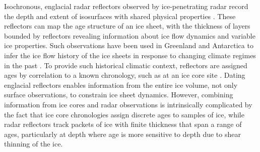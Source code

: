 

Isochronous, englacial radar reflectors observed by ice-penetrating radar record the depth and extent of isosurfaces with shared physical properties \citep{siegert1998,dowdeswell2004}. These reflectors can map the age structure of an ice sheet, with the thickness of layers bounded by reflectors revealing information about ice flow dynamics and variable ice properties. Such observations have been used in Greenland and Antarctica to infer the ice flow history of the ice sheets in response to changing climate regimes in the past \citep{macgregor2015}. To provide such historical climatic context, reflectors are assigned ages by correlation to a known chronology, such as at an ice core site \citep{cavitte2016}. Dating englacial reflectors enables information from the entire ice volume, not only surface observations, to constrain ice sheet dynamics. However, combining information from ice cores and radar observations is intrinsically complicated by the fact that ice core chronologies assign discrete ages to samples of ice, while radar reflectors track packets of ice with finite thickness that span a range of ages, particularly at depth where age is more sensitive to depth due to shear thinning of the ice. 

